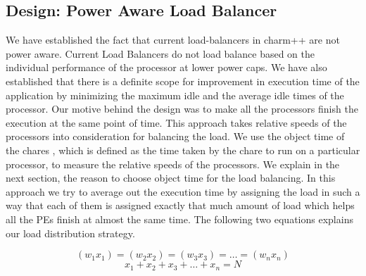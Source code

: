 \subsection{Design: Power Aware Load Balancer}
We have established the fact that current load-balancers in charm++ are not
power aware. Current Load Balancers do not load balance based on the individual
performance of the processor at lower power caps. We have also established that
there is a definite scope for improvement in execution time of the application
by minimizing the maximum idle and the average idle times of the processor.
Our motive behind the design was to make all the processors finish the
execution at the same point of time. This approach takes relative speeds of the
processors into consideration for balancing the load. We use the object time of
the chares
, which is defined as the time taken by the chare to run on a
particular processor, to measure the relative speeds of the processors. We
explain in the next section, the reason to choose object time for the load
balancing.  In this approach we try to average out the execution time by
assigning the load in such a way that each of them is assigned exactly that
much amount of load which helps all the PEs finish at almost the same time. 
The following two equations explains our load distribution strategy.  


    \begin{equation} \label{eq:3}
      (w_1x_1) = (w_2x_2) = (w_3x_3) = \dots = (w_nx_n) 
    \end{equation}
    \begin{equation} \label{eq:4}
      x_1 + x_2 + x_3 + \dots + x_n = N
    \end{equation}

